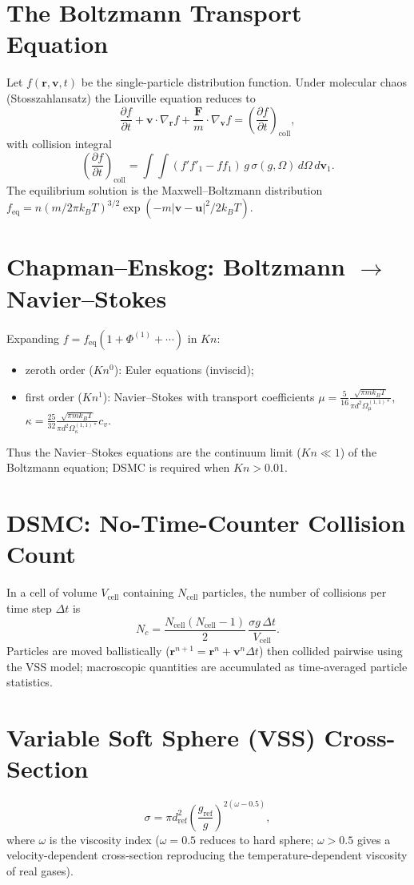 \section{The Boltzmann Transport Equation}
Let $f(\mathbf r,\mathbf v,t)$ be the single-particle distribution function.
Under molecular chaos (Stosszahlansatz) the Liouville equation reduces to
\[
\frac{\partial f}{\partial t}+\mathbf v\cdot\nabla_{\mathbf r}f
+\frac{\mathbf F}{m}\cdot\nabla_{\mathbf v}f
=\left(\frac{\partial f}{\partial t}\right)_{\mathrm{coll}},
\]
with collision integral
\[
\left(\frac{\partial f}{\partial t}\right)_{\mathrm{coll}}
=\int\!\int (f'f'_1-ff_1)\,g\,\sigma(g,\Omega)\,d\Omega\,d\mathbf v_1.
\]
The equilibrium solution is the Maxwell--Boltzmann distribution
$f_{\mathrm{eq}}=n(m/2\pi k_BT)^{3/2}\exp(-m|\mathbf v-\mathbf u|^2/2k_BT)$.

\section{\texorpdfstring{Chapman--Enskog: Boltzmann $\to$ Navier--Stokes}{Chapman--Enskog: Boltzmann to Navier--Stokes}}
Expanding $f=f_{\mathrm{eq}}(1+\Phi^{(1)}+\cdots)$ in $Kn$:
\begin{itemize}
  \item zeroth order ($Kn^0$): Euler equations (inviscid);
  \item first order ($Kn^1$): Navier--Stokes with transport coefficients
  $\mu=\frac{5}{16}\frac{\sqrt{\pi mk_BT}}{\pi d^2\Omega_\mu^{(1,1)*}}$,
  $\kappa=\frac{25}{32}\frac{\sqrt{\pi mk_BT}}{\pi d^2\Omega_\kappa^{(1,1)*}}c_v$.
\end{itemize}
Thus the Navier--Stokes equations are the continuum limit ($Kn\ll1$) of the
Boltzmann equation; DSMC is required when $Kn>0.01$.

\section{DSMC: No-Time-Counter Collision Count}
In a cell of volume $V_{\mathrm{cell}}$ containing $N_{\mathrm{cell}}$
particles, the number of collisions per time step $\Delta t$ is
\[
N_c=\frac{N_{\mathrm{cell}}(N_{\mathrm{cell}}-1)}{2}\,
\frac{\sigma g\,\Delta t}{V_{\mathrm{cell}}}.
\]
Particles are moved ballistically ($\mathbf r^{n+1}=\mathbf r^n+\mathbf v^n\Delta t$)
then collided pairwise using the VSS model; macroscopic quantities are accumulated
as time-averaged particle statistics.

\section{Variable Soft Sphere (VSS) Cross-Section}
\[
\sigma=\pi d_{\mathrm{ref}}^2\left(\frac{g_{\mathrm{ref}}}{g}\right)^{2(\omega-0.5)},
\]
where $\omega$ is the viscosity index ($\omega=0.5$ reduces to hard sphere;
$\omega>0.5$ gives a velocity-dependent cross-section reproducing the
temperature-dependent viscosity of real gases).

